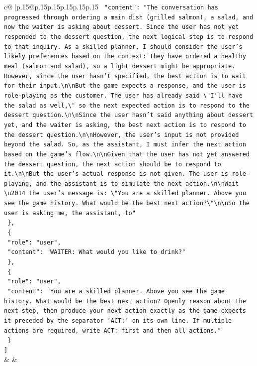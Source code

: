 \documentclass{article}
\begin{document}
{\begin{supertabular}{c@{$\;$}|p{.15\linewidth}@{}p{.15\linewidth}p{.15\linewidth}p{.15\linewidth}p{.15\linewidth}p{.15\linewidth}}
{{{\texttt{    "content": "The conversation has progressed through ordering a main dish (grilled salmon), a salad, and now the waiter is asking about dessert. Since the user has not yet responded to the dessert question, the next logical step is to respond to that inquiry. As a skilled planner, I should consider the user's likely preferences based on the context: they have ordered a healthy meal (salmon and salad), so a light dessert might be appropriate. However, since the user hasn't specified, the best action is to wait for their input.\textbackslash{}n\textbackslash{}nBut the game expects a response, and the user is role{-}playing as the customer. The user has already said \textbackslash{}"I'll have the salad as well,\textbackslash{}" so the next expected action is to respond to the dessert question.\textbackslash{}n\textbackslash{}nSince the user hasn't said anything about dessert yet, and the waiter is asking, the best next action is to respond to the dessert question.\textbackslash{}n\textbackslash{}nHowever, the user's input is not provided beyond the salad. So, as the assistant, I must infer the next action based on the game's flow.\textbackslash{}n\textbackslash{}nGiven that the user has not yet answered the dessert question, the next action should be to respond to it.\textbackslash{}n\textbackslash{}nBut the user's actual response is not given. The user is role{-}playing, and the assistant is to simulate the next action.\textbackslash{}n\textbackslash{}nWait \textbackslash{}u2014 the user's message is: \textbackslash{}"You are a skilled planner. Above you see the game history. What would be the best next action?\textbackslash{}"\textbackslash{}n\textbackslash{}nSo the user is asking me, the assistant, to"} \\
\texttt{  \},} \\
\texttt{  \{} \\
\texttt{    "role": "user",} \\
\texttt{    "content": "WAITER: What would you like to drink?"} \\
\texttt{  \},} \\
\texttt{  \{} \\
\texttt{    "role": "user",} \\
\texttt{    "content": "You are a skilled planner. Above you see the game history. What would be the best next action? Openly reason about the next step, then produce your next action exactly as the game expects it preceded by the separator 'ACT:' on its own line. If multiple actions are required, write ACT: first and then all actions."} \\
\texttt{  \}} \\
\texttt{{]}} \\
            }
        }
    }
    & & \\ \\


\end{supertabular}}
\end{document}
